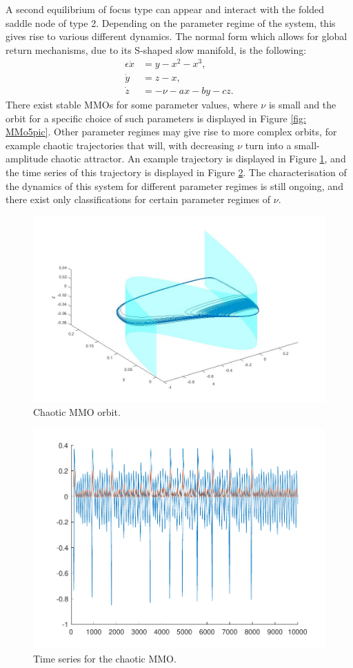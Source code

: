 A second equilibrium of focus type can appear and interact with the folded saddle node of type 2.
Depending on the parameter regime of the system, this gives rise to various different dynamics.
The normal form which allows for global return mechanisms, due to its S-shaped slow manifold, is the following:
\begin{align*}
\epsilon \dot{x} &= y - x^2 - x^3, \\
\dot{y} &= z - x, \\
\dot{z} &= -\nu -ax -by -cz.
\end{align*}
There exist stable MMOs for some parameter values, where $\nu$ is small and the orbit for a specific choice of such parameters is displayed in Figure \ref{fig: MMo5pic}. Other parameter regimes may give rise to more complex orbits, for example chaotic trajectories that will, with decreasing $\nu$ turn into a small-amplitude chaotic attractor. An example trajectory is displayed in Figure \ref{fig: MMo3pic}, and the time series of this trajectory is displayed in Figure \ref{fig: MMo4pic}. The characterisation of the dynamics of this system for different parameter regimes is still ongoing, and there exist only classifications for certain parameter regimes of $\nu$.
\begin{figure}[h!]\centering
	\includegraphics[width= 0.5 \textwidth]{Images/chaoticEvdp}
	\caption{Chaotic MMO orbit.}
	\label{fig: MMo3pic}
\end{figure}
\begin{figure}[h!]\centering
	\includegraphics[width= 0.5 \textwidth]{Images/eVDPts}
	\caption{Time series for the chaotic MMO.}
	\label{fig: MMo4pic}
\end{figure}
